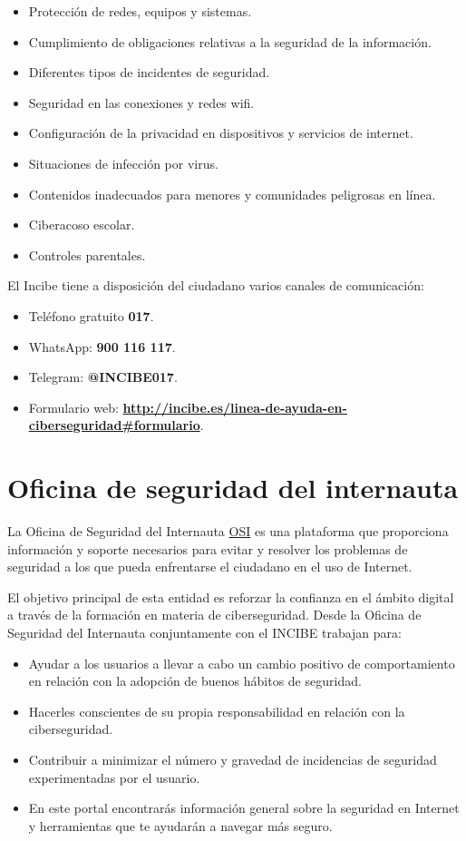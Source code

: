 \documentclass[
  a4paper,
  openany]{book}
\begin{document}
\begin{itemize}
\item
  Protección de redes, equipos y sistemas.
\item
  Cumplimiento de obligaciones relativas a la seguridad de la información.
\item
  Diferentes tipos de incidentes de seguridad.
\item
  Seguridad en las conexiones y redes wifi.
\item
  Configuración de la privacidad en dispositivos y servicios de internet.
\item
  Situaciones de infección por virus.
\item
  Contenidos inadecuados para menores y comunidades peligrosas en línea.
\item
  Ciberacoso escolar.
\item
  Controles parentales.
\end{itemize}

El Incibe tiene a disposición del ciudadano varios canales de comunicación:

\begin{itemize}
\item
  Teléfono gratuito \textbf{017}.
\item
  WhatsApp: \textbf{900 116 117}.
\item
  Telegram: \textbf{@INCIBE017}.
\item
  Formulario web: \textbf{\url{http://incibe.es/linea-de-ayuda-en-ciberseguridad\#formulario}}.
\end{itemize}

\hypertarget{oficina-de-seguridad-del-internauta}{%
\section{Oficina de seguridad del internauta}\label{oficina-de-seguridad-del-internauta}}

La Oficina de Seguridad del Internauta \href{https://www.osi.es/}{OSI} es una plataforma que proporciona información y soporte necesarios para evitar y resolver los problemas de seguridad a los que pueda enfrentarse el ciudadano en el uso de Internet.

El objetivo principal de esta entidad es reforzar la confianza en el ámbito digital a través de la formación en materia de ciberseguridad. Desde la Oficina de Seguridad del Internauta conjuntamente con el INCIBE trabajan para:

\begin{itemize}
\item
  Ayudar a los usuarios a llevar a cabo un cambio positivo de comportamiento en relación con la adopción de buenos hábitos de seguridad.
\item
  Hacerles conscientes de su propia responsabilidad en relación con la ciberseguridad.
\item
  Contribuir a minimizar el número y gravedad de incidencias de seguridad experimentadas por el usuario.
\item
  En este portal encontrarás información general sobre la seguridad en Internet y herramientas que te ayudarán a navegar más seguro.
\end{itemize}
\end{document}

